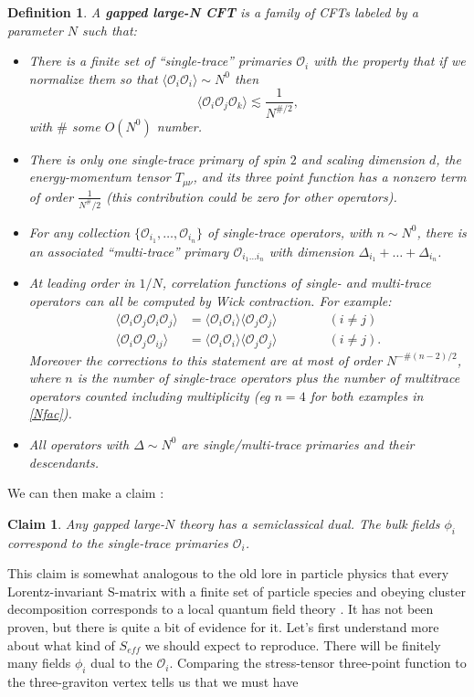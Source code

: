 \documentclass[toc]{PoS}
\newcommand{\be}{\begin{equation}}
\newcommand{\ee}{\end{equation}}
\newcommand{\bi}{\begin{itemize}}
\newcommand{\ei}{\end{itemize}}
\newcommand{\lan}{\langle}
\newcommand{\ran}{\rangle}
\newcommand{\mO}{\mathcal{O}}
\newtheorem{mydef}{Definition}[section]
\newtheorem{claim}{Claim}[section]
\begin{document}
\begin{mydef}\label{Ndef}
A \textbf{gapped large-N CFT} is a family of CFTs labeled by a parameter $N$ such that:
\bi
\item There is a finite set of ``single-trace'' primaries $\mO_i$ with the property that if we normalize them so that $\lan\mO_i \mO_i\ran\sim N^0$ then 
\be\label{N3pt}
\lan \mO_i \mO_j \mO_k\ran\lesssim \frac{1}{N^{\#/2}},
\ee
with $\#$ some $O(N^0)$ number.  
\item There is only one single-trace primary of spin $2$ and scaling dimension $d$, the energy-momentum tensor $T_{\mu\nu}$, and its three point function has a nonzero term of order $\frac{1}{N^{\#}/2}$ (this contribution could be zero for other operators).    
\item For any collection $\{\mO_{i_1},\ldots,\mO_{i_n}\}$ of single-trace operators, with $n\sim N^0$, there is an associated ``multi-trace'' primary $\mO_{i_1\ldots i_n}$ with dimension $\Delta_{i_1}+\ldots+\Delta_{i_n}$.
\item At leading order in $1/N$, correlation functions of single- and multi-trace operators can all be computed by Wick contraction.  For example:
\begin{align}\nonumber
\lan\mO_i\mO_j \mO_i \mO_j\ran&=\lan\mO_i \mO_i\ran \lan\mO_j \mO_j\ran \qquad \qquad (i\neq j)\\
\lan \mO_i \mO_j \mO_{ij}\ran&=\lan\mO_i\mO_i\ran \lan \mO_j\mO_j\ran \qquad \qquad (i\neq j).\label{Nfac}
\end{align}
Moreover the corrections to this statement are at most of order $N^{-\#(n-2)/2}$, where $n$ is the number of single-trace operators plus the number of multitrace operators counted including multiplicity (eg $n=4$ for both examples in \eqref{Nfac}).
\item All operators with $\Delta\sim N^0$ are single/multi-trace primaries and their descendants.

\ei
\end{mydef}
We can then make a claim \cite{Heemskerk:2009pn}:
\begin{claim}
Any gapped large-$N$ theory has a semiclassical dual. The bulk fields $\phi_i$ correspond to the single-trace primaries $\mO_i$. 
\end{claim}
This claim is somewhat analogous to the old lore in particle physics that every Lorentz-invariant S-matrix with a finite set of particle species and obeying cluster decomposition corresponds to a local quantum field theory \cite{Weinberg:1995mt}.  It has not  been proven, but there is quite a bit of evidence for it.  Let's first understand more about what kind of $S_{eff}$ we should expect to reproduce.  There will be finitely many fields $\phi_i$ dual to the $\mO_i$.  Comparing the stress-tensor three-point function to the three-graviton vertex tells us that we must have
\end{document}
